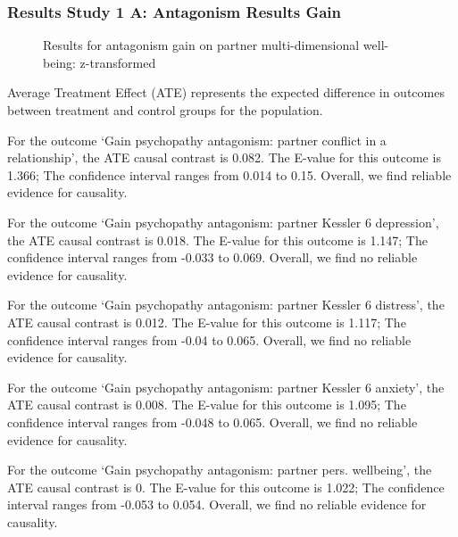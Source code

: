 \documentclass[
  singlecolumn]{article}
\begin{document}
\subsubsection{Results Study 1 A: Antagonism Results
Gain}\label{results-study-1-a-antagonism-results-gain}

\begin{figure}


\caption{\label{fig-results-antagonism-gain}Results for antagonism gain
on partner multi-dimensional well-being: z-transformed}

\end{figure}%

\newpage{}

Average Treatment Effect (ATE) represents the expected difference in
outcomes between treatment and control groups for the population.

For the outcome `Gain psychopathy antagonism: partner conflict in a
relationship', the ATE causal contrast is 0.082. The E-value for this
outcome is 1.366; The confidence interval ranges from 0.014 to 0.15.
Overall, we find reliable evidence for causality.

For the outcome `Gain psychopathy antagonism: partner Kessler 6
depression', the ATE causal contrast is 0.018. The E-value for this
outcome is 1.147; The confidence interval ranges from -0.033 to 0.069.
Overall, we find no reliable evidence for causality.

For the outcome `Gain psychopathy antagonism: partner Kessler 6
distress', the ATE causal contrast is 0.012. The E-value for this
outcome is 1.117; The confidence interval ranges from -0.04 to 0.065.
Overall, we find no reliable evidence for causality.

For the outcome `Gain psychopathy antagonism: partner Kessler 6
anxiety', the ATE causal contrast is 0.008. The E-value for this outcome
is 1.095; The confidence interval ranges from -0.048 to 0.065. Overall,
we find no reliable evidence for causality.

For the outcome `Gain psychopathy antagonism: partner pers. wellbeing',
the ATE causal contrast is 0. The E-value for this outcome is 1.022; The
confidence interval ranges from -0.053 to 0.054. Overall, we find no
reliable evidence for causality.
\end{document}
